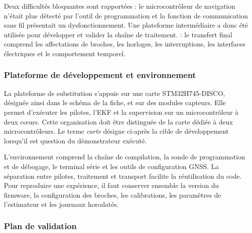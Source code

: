 
Deux difficultés bloquantes sont rapportées : le microcontrôleur de navigation n'était plus détecté par l'outil de programmation et la fonction de communication sans fil présentait un dysfonctionnement. Une plateforme intermédiaire a donc été utilisée pour développer et valider la chaîne de traitement.  : le transfert final comprend les affectations de broches, les horloges, les interruptions, les interfaces électriques et le comportement temporel.
\FloatBarrier

\subsubsection{Plateforme de développement et environnement}

La plateforme de substitution s'appuie sur une carte STM32H745-DISCO, désignée ainsi dans le schéma de la fiche, et sur des modules capteurs. Elle permet d'exécuter les pilotes, l'EKF et la supervision sur un microcontrôleur à deux cœurs. Cette organisation doit être distinguée de la carte dédiée à deux microcontrôleurs. Le terme \emph{carte} désigne ci-après la cible de développement lorsqu'il est question du démonstrateur exécuté.


L'environnement comprend la chaîne de compilation, la sonde de programmation et de débogage, le terminal série et les outils de configuration GNSS. La séparation entre pilotes, traitement et transport facilite la réutilisation du code. Pour reproduire une expérience, il faut conserver ensemble la version du firmware, la configuration des broches, les calibrations, les paramètres de l'estimateur et les journaux horodatés.
\FloatBarrier

\subsubsection{Plan de validation}

